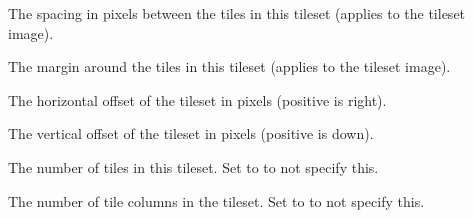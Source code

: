 \documentclass[letterpaper,10pt,english]{sphinxmanual}
\begin{document}
\begin{fulllineitems}

\begin{fulllineitems}
\label{index:tmx.Tileset.spacing}
The spacing in pixels between the tiles in this tileset (applies
to the tileset image).

\end{fulllineitems}


\begin{fulllineitems}
\label{index:tmx.Tileset.margin}
The margin around the tiles in this tileset (applies to the
tileset image).

\end{fulllineitems}


\begin{fulllineitems}
\label{index:tmx.Tileset.xoffset}
The horizontal offset of the tileset in pixels (positive is
right).

\end{fulllineitems}


\begin{fulllineitems}
\label{index:tmx.Tileset.yoffset}
The vertical offset of the tileset in pixels (positive is down).

\end{fulllineitems}


\begin{fulllineitems}
\label{index:tmx.Tileset.tilecount}
The number of tiles in this tileset.  Set to  to not
specify this.

\end{fulllineitems}


\begin{fulllineitems}
\label{index:tmx.Tileset.columns}
The number of tile columns in the tileset.  Set to 
to not specify this.

\end{fulllineitems}


\end{fulllineitems}
\end{document}
